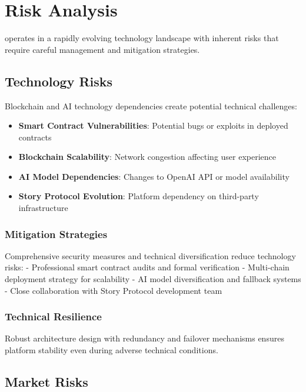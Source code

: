 \section{Risk Analysis}
\label{sec:risk-analysis}

\storyhouse{} operates in a rapidly evolving technology landscape with inherent risks that require careful management and mitigation strategies.

\subsection{Technology Risks}

Blockchain and AI technology dependencies create potential technical challenges:

\begin{itemize}
    \item \textbf{Smart Contract Vulnerabilities}: Potential bugs or exploits in deployed contracts
    \item \textbf{Blockchain Scalability}: Network congestion affecting user experience
    \item \textbf{AI Model Dependencies}: Changes to OpenAI API or model availability
    \item \textbf{Story Protocol Evolution}: Platform dependency on third-party infrastructure
\end{itemize}

\subsubsection{Mitigation Strategies}

Comprehensive security measures and technical diversification reduce technology risks:
- Professional smart contract audits and formal verification
- Multi-chain deployment strategy for scalability
- AI model diversification and fallback systems
- Close collaboration with Story Protocol development team

\subsubsection{Technical Resilience}

Robust architecture design with redundancy and failover mechanisms ensures platform stability even during adverse technical conditions.

\subsection{Market Risks}

